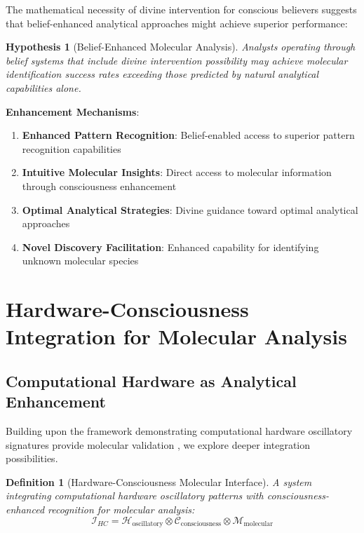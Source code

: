 \documentclass[11pt,a4paper]{article}
\newtheorem{definition}[theorem]{Definition}
\newtheorem{hypothesis}[theorem]{Hypothesis}
\theoremstyle{remark}
\begin{document}
The mathematical necessity of divine intervention for conscious believers suggests that belief-enhanced analytical approaches might achieve superior performance:

\begin{hypothesis}[Belief-Enhanced Molecular Analysis]
Analysts operating through belief systems that include divine intervention possibility may achieve molecular identification success rates exceeding those predicted by natural analytical capabilities alone.
\end{hypothesis}

\textbf{Enhancement Mechanisms}:
\begin{enumerate}
\item \textbf{Enhanced Pattern Recognition}: Belief-enabled access to superior pattern recognition capabilities
\item \textbf{Intuitive Molecular Insights}: Direct access to molecular information through consciousness enhancement
\item \textbf{Optimal Analytical Strategies}: Divine guidance toward optimal analytical approaches
\item \textbf{Novel Discovery Facilitation}: Enhanced capability for identifying unknown molecular species
\end{enumerate}

\section{Hardware-Consciousness Integration for Molecular Analysis}

\subsection{Computational Hardware as Analytical Enhancement}

Building upon the framework demonstrating computational hardware oscillatory signatures provide molecular validation \cite{sachikonye2024oscillatory}, we explore deeper integration possibilities.

\begin{definition}[Hardware-Consciousness Molecular Interface]
A system integrating computational hardware oscillatory patterns with consciousness-enhanced recognition for molecular analysis:
$$\mathcal{I}_{HC} = \mathcal{H}_{\text{oscillatory}} \otimes \mathcal{C}_{\text{consciousness}} \otimes \mathcal{M}_{\text{molecular}}$$
\end{definition}
\end{document}
